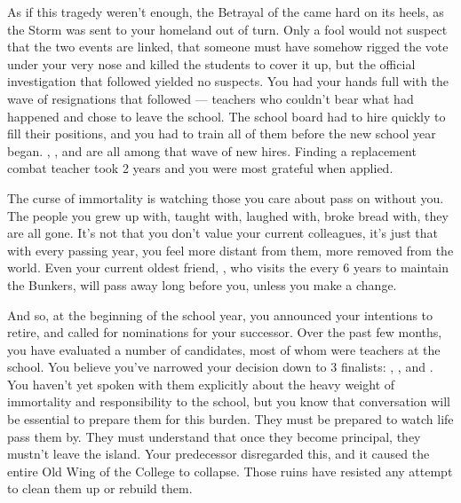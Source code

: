 \documentclass[char]{GL2020}
\begin{document}
As if this tragedy weren't enough, the Betrayal of the \pShip{} came hard on its heels, as the Storm was sent to your homeland out of turn. Only a fool would not suspect that the two events are linked, that someone must have somehow rigged the vote under your very nose and killed the students to cover it up, but the official investigation that followed yielded no suspects. You had your hands full with the wave of resignations that followed — teachers who couldn't bear what had happened and chose to leave the school. The school board had to hire quickly to fill their positions, and you had to train all of them before the new school year began. \cPrince{\full}, \cChupInventor{\full}, and \cChupSecond{\full} are all among that wave of new hires. Finding a replacement combat teacher took 2 years and you were most grateful when \cInterpol{\full} applied.

The curse of immortality is watching those you care about pass on without you. The people you grew up with, taught with, laughed with, broke bread with, they are all gone. It's not that you don't value your current colleagues, it's just that with every passing year, you feel more distant from them, more removed from the world. Even your current oldest friend, \cBunker{\full}, who visits the \pSc{} every 6 years to maintain the Bunkers, will pass away long before you, unless you make a change.  

And so, at the beginning of the school year, you announced your intentions to retire, and called for nominations for your successor. Over the past few months, you have evaluated a number of candidates, most of whom were teachers at the school. You believe you've narrowed your decision down to 3 finalists: \cMusic{\full}, \cBeetle{\full}, and \cChupSecond{\full}. You haven't yet spoken with them explicitly about the heavy weight of immortality and responsibility to the school, but you know that conversation will be essential to prepare them for this burden. They must be prepared to watch life pass them by. They must understand that once they become principal, they mustn't leave the island. Your predecessor disregarded this, and it caused the entire Old Wing of the College to collapse. Those ruins have resisted any attempt to clean them up or rebuild them.
\end{document}
